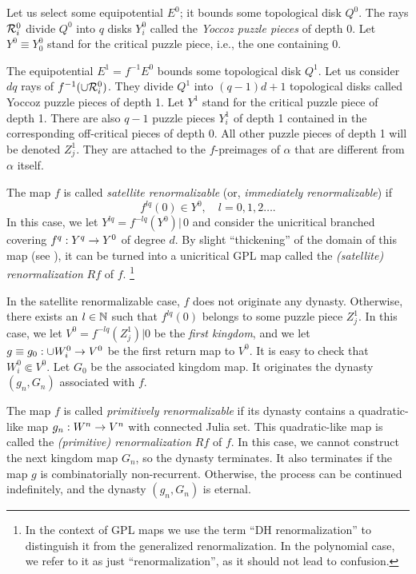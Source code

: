  
Let us select some equipotential $E^0$; it bounds some topological disk $Q^0$.  
The rays ${\cal R}_i^0$ divide $Q^0$ into $q$ disks $Y^0_i$ called the {\it Yoccoz puzzle pieces} of depth 0.  
Let $Y^0\equiv Y^0_0$ stand for the critical puzzle piece, i.e., the one containing 0. 

The equipotential  $E^1=f^{-1}E^0$ bounds some topological disk $Q^1$.
Let us consider  $dq$  rays of  $f^{-1} (\cup{\cal R}_i^0)$. 
They divide $Q^1$ into $(q-1)d+1$ topological disks called Yoccoz puzzle pieces of depth 1. 
Let $Y^1$ stand for the critical puzzle piece of depth 1. 
There are also $q-1$  puzzle pieces $Y^1_i$ of depth 1 contained in the corresponding off-critical pieces of depth 0.
All other puzzle pieces of depth 1 will be denoted $Z_j^1$. They are attached to the $f$-preimages of $\alpha$
that are different from $\alpha$ itself. 

  The map $f$ is called   {\it satellite renormalizable}
(or, {\it immediately renormalizable})  if
 $$
           f^{lq}(0)\in Y^0,\quad  l=0,1,2\dots.
$$
In this case,  we let $Y^{lq}  = f^{-lq}(Y^0)|\,0$ and consider the unicritical branched covering
$f^q: Y^q\rightarrow Y^0$ of degree $d$. By slight ``thickening'' of the domain of this map (see \cite{M}), 
it can be turned into a unicritical GPL map called the {\it (satellite) renormalization} $Rf$ of $f$.%
\footnote{In the context of GPL maps we use the term ``DH renormalization''
to distinguish it from the generalized renormalization.
In the polynomial case, we refer to it as just ``renormalization'',
as it should not lead to confusion.} 

\ssk
In the satellite renormalizable case, $f$ does not originate any dynasty. 
Otherwise, 
there exists an $l\in {\Bbb N}$ such that $f^{lq}(0)$ belongs
to some puzzle piece $Z_j^1$.
In this case, we let $V^0= f^{-lq}(Z_j^1)|0$ be the {\it first kingdom}, 
and we let $g\equiv g_0: \cup W_i^0\rightarrow V^0$ be the first return map to $V^0$. 
It is easy to check that  $W_i^0 \Subset V^0$. 
%
Let $G_0$ be the associated kingdom map. It originates the dynasty $(g_n, G_n) $ associated with $f$.


\ssk
The map $f$ is called {\it primitively renormalizable} if its dynasty contains  a quadratic-like map $g_n: W^n\rightarrow V^n$
with connected Julia set. This quadratic-like map  is called the {\it (primitive) renormalization} $Rf$ of $f$.
In this case, we cannot construct the next kingdom map  $G_n$,
so the dynasty terminates. 
It also terminates if the map $g$ is combinatorially non-recurrent. 
Otherwise, the process can be continued indefinitely,
and the dynasty $(g_n, G_n)$ is eternal.

